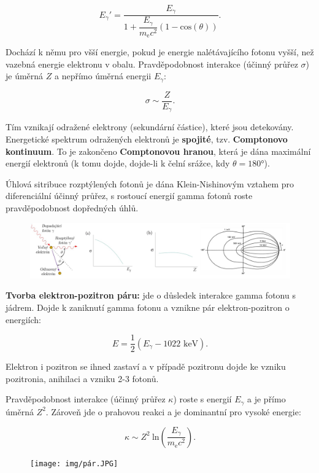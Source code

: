 $$ E_\gamma' = \dfrac{E_\gamma}{1 + \dfrac{E_\gamma}{m_\text{e}c^2}(1 - \text{cos}(\theta))}. $$

Dochází k němu pro všší energie, pokud je energie nalétávajícího fotonu vyšší, než vazebná energie elektronu v obalu. Pravděpodobnost interakce (účinný průřez $\sigma$) je úměrná $Z$ a nepřímo úměrná energii $E_\gamma$:

$$ \sigma \sim \dfrac{Z}{E_\gamma}. $$

Tím vznikají odražené elektrony (sekundární částice), které jsou detekovány. Energetické spektrum odražených elektronů je \textbf{spojité}, tzv. \textbf{Comptonovo kontinuum}. To je zakončeno \textbf{Comptonovou hranou}, která je dána maximální energií elektronů (k tomu dojde, dojde-li k čelní srážce, kdy $\theta = 180°$).

Úhlová sitribuce rozptýlených fotonů je dána Klein-Nishinovým vztahem pro diferenciální účinný průřez, s rostoucí energií gamma fotonů roste pravděpodobnost dopředných úhlů.

\begin{figure}[H]
    \centering
    \includegraphics[width=1\textwidth]{img/Compton.JPG}
\end{figure}

\textbf{Tvorba elektron-pozitron páru:} jde o důsledek interakce gamma fotonu s jádrem. Dojde k zaniknutí gamma fotonu a vznikne pár elektron-pozitron o energiích:

$$ E = \dfrac{1}{2} (E_\gamma - 1022 \text{ keV}). $$

Elektron i pozitron se ihned zastaví a v případě pozitronu dojde ke vzniku pozitronia, anihilaci a vzniku 2-3 fotonů.

Pravděpodobnost interakce (účinný průřez $\kappa$) roste s energií $E_\gamma$ a je přímo úměrná $Z^2$. Zároveň jde o prahovou reakci a je dominantní pro vysoké energie:

$$ \kappa \sim Z^2 \: \text{ln} \left( \dfrac{E_\gamma}{m_\text{e} c^2} \right). $$

\begin{figure}[H]
    \centering
    \texttt{[image: img/pár.JPG]}
\end{figure}

